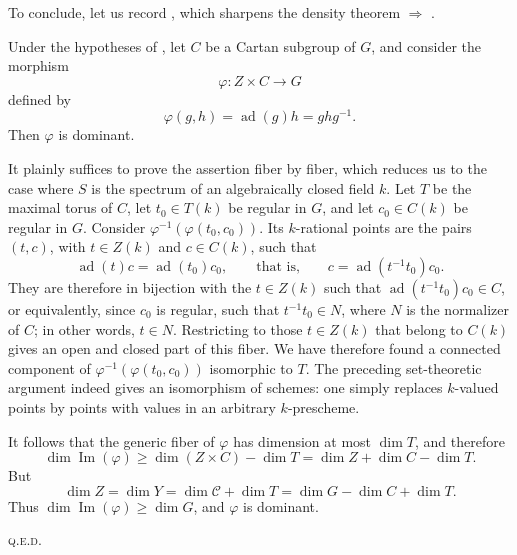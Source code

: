 To conclude, let us record , which sharpens the
density theorem   \(\Rightarrow\) .

\begin{corollary}
Under the hypotheses of , let \(C\) be a Cartan subgroup of \(G\),
and consider the morphism
\[
  \varphi:Z\times C\longrightarrow G
\]
defined by
\[
  \varphi(g,h)=\operatorname{ad}(g)h=ghg^{-1}.
\]
Then \(\varphi\) is dominant.
\end{corollary}

It plainly suffices to prove the assertion fiber by fiber, which
reduces us to the case where \(S\) is the spectrum of an
algebraically closed field \(k\). Let \(T\) be the maximal torus of
\(C\), let \(t_0\in T(k)\) be regular in \(G\), and let
\(c_0\in C(k)\) be regular in \(G\). Consider
\(\varphi^{-1}(\varphi(t_0,c_0))\). Its \(k\)-rational points are the
pairs \((t,c)\), with \(t\in Z(k)\) and \(c\in C(k)\), such that
\[
  \operatorname{ad}(t)c=\operatorname{ad}(t_0)c_0,
  \qquad\text{that is,}\qquad
  c=\operatorname{ad}(t^{-1}t_0)c_0.
\]
They are therefore in bijection with the \(t\in Z(k)\) such that
\(\operatorname{ad}(t^{-1}t_0)c_0\in C\), or equivalently, since
\(c_0\) is regular, such that \(t^{-1}t_0\in N\), where \(N\) is the
normalizer of \(C\); in other words, \(t\in N\). Restricting to those
\(t\in Z(k)\) that belong to \(C(k)\) gives an open and closed part
of this fiber. We have therefore found a connected component of
\(\varphi^{-1}(\varphi(t_0,c_0))\) isomorphic to \(T\). The preceding
set-theoretic argument indeed gives an isomorphism of schemes: one
simply replaces \(k\)-valued points by points with values in an
arbitrary \(k\)-prescheme.

It follows that the generic fiber of \(\varphi\) has dimension at
most \(\dim T\), and therefore
\[
  \dim\operatorname{Im}(\varphi)
  \geq
  \dim(Z\times C)-\dim T
  =
  \dim Z+\dim C-\dim T.
\]
But
\[
  \dim Z
  =
  \dim Y
  =
  \dim\mathcal C+\dim T
  =
  \dim G-\dim C+\dim T.
\]
Thus \(\dim\operatorname{Im}(\varphi)\geq\dim G\), and \(\varphi\)
is dominant.
\par\hfill\textsc{q.e.d.}

